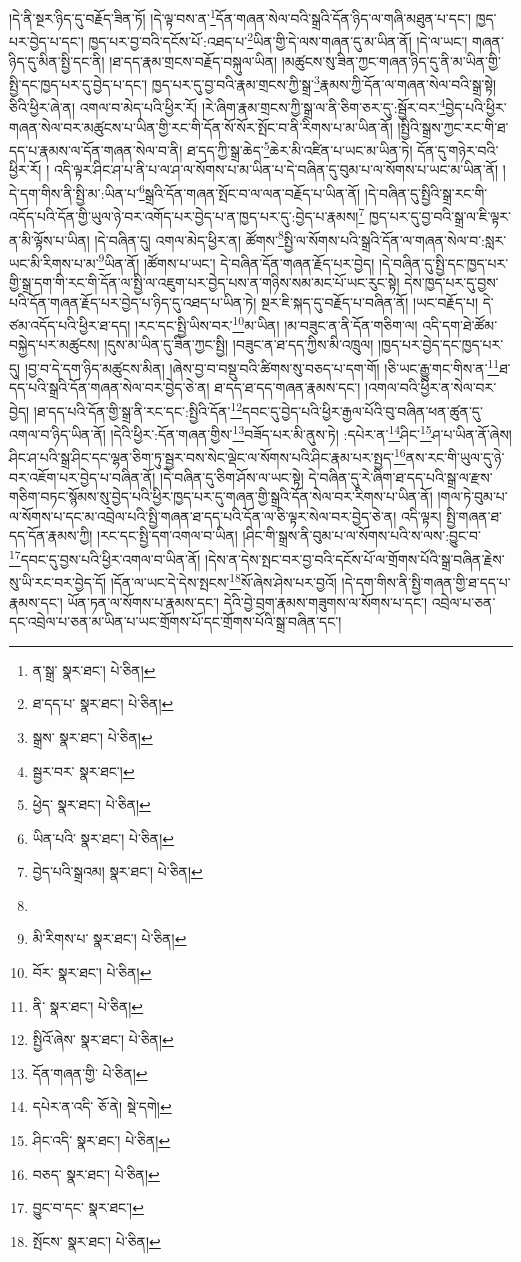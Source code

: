 །དེ་ནི་སྔར་ཉིད་དུ་བརྗོད་ཟིན་ཏོ། །དེ་ལྟ་བས་ན་\footnote{ན་སྒྲ་  སྣར་ཐང་།  པེ་ཅིན། }དོན་གཞན་སེལ་བའི་སྒྲའི་དོན་ཉིད་ལ་གཞི་མཐུན་པ་དང་། ཁྱད་པར་བྱེད་པ་དང་། ཁྱད་པར་བྱ་བའི་དངོས་པོ་:འཐད་པ་\footnote{ཐ་དད་པ་  སྣར་ཐང་།  པེ་ཅིན། }ཡིན་གྱི་དེ་ལས་གཞན་དུ་མ་ཡིན་ནོ། །དེ་ལ་ཡང་། གཞན་ཉིད་དུ་མིན་སྤྱི་དང་ནི། །ཐ་དད་རྣམ་གྲངས་བརྗོད་བསྐུལ་ཡིན། །མཚུངས་སུ་ཟིན་ཀྱང་གཞན་ཉིད་དུ་ནི་མ་ཡིན་གྱི་སྤྱི་དང་ཁྱད་པར་དུ་བྱེད་པ་དང་། ཁྱད་པར་དུ་བྱ་བའི་རྣམ་གྲངས་ཀྱི་སྒྲ་\footnote{སྒྲས་  སྣར་ཐང་།  པེ་ཅིན། }རྣམས་ཀྱི་དོན་ལ་གཞན་སེལ་བའི་སྒྲ་སྟེ། ཅིའི་ཕྱིར་ཞེ་ན། འགལ་བ་མེད་པའི་ཕྱིར་རོ། །རེ་ཞིག་རྣམ་གྲངས་ཀྱི་སྒྲ་ལ་ནི་ཅིག་ཅར་དུ་:སྦྱོར་བར་\footnote{སྦྱར་བར་  སྣར་ཐང་། }བྱེད་པའི་ཕྱིར་གཞན་སེལ་བར་མཚུངས་པ་ཡིན་གྱི་རང་གི་དོན་སོ་སོར་སྤོང་བ་ནི་རིགས་པ་མ་ཡིན་ནོ། །སྤྱིའི་སྒྲས་ཀྱང་རང་གི་ཐ་དད་པ་རྣམས་ལ་དོན་གཞན་སེལ་བ་ནི། ཐ་དད་ཀྱི་སྒྲ་ཆེད་\footnote{ཕྱེད་  སྣར་ཐང་།  པེ་ཅིན། }ཆེར་མི་འཛིན་པ་ཡང་མ་ཡིན་ཏེ། དོན་དུ་གཉེར་བའི་ཕྱིར་རོ། །
འདི་ལྟར་ཤིང་ཤ་པ་ནི་པ་ལ་ཤ་ལ་སོགས་པ་མ་ཡིན་པ་དེ་བཞིན་དུ་བུམ་པ་ལ་སོགས་པ་ཡང་མ་ཡིན་ནོ། །དེ་དག་གིས་ནི་སྤྱི་མ་:ཡིན་པ་\footnote{ཡིན་པའི་  སྣར་ཐང་།  པེ་ཅིན། }སྒྲའི་དོན་གཞན་སྤོང་བ་ལ་ལན་བརྗོད་པ་ཡིན་ནོ། །དེ་བཞིན་དུ་སྤྱིའི་སྒྲ་རང་གི་འདོད་པའི་དོན་གྱི་ཡུལ་ཉེ་བར་འགོད་པར་བྱེད་པ་ན་ཁྱད་པར་དུ་:བྱེད་པ་རྣམས།\footnote{བྱེད་པའི་སྒྲའམ།  སྣར་ཐང་།  པེ་ཅིན། } ཁྱད་པར་དུ་བྱ་བའི་སྒྲ་ལ་ཇི་ལྟར་ན་མི་ལྟོས་པ་ཡིན། །དེ་བཞིན་དུ། འགལ་མེད་ཕྱིར་ན། ཚོགས་\footnote{}སྤྱི་ལ་སོགས་པའི་སྒྲའི་དོན་ལ་གཞན་སེལ་བ་:སླར་ཡང་མི་རིགས་པ་མ་\footnote{མི་རིགས་པ་  སྣར་ཐང་།  པེ་ཅིན། }ཡིན་ནོ། །ཚོགས་པ་ཡང་། དེ་བཞིན་དོན་གཞན་རྗོད་པར་བྱེད། །དེ་བཞིན་དུ་སྤྱི་དང་ཁྱད་པར་གྱི་སྒྲ་དག་གི་རང་གི་དོན་ལ་སྤྱི་ལ་འཇུག་པར་བྱེད་པས་ན་གཉིས་སམ་མང་པོ་ཡང་རུང་སྟེ། དེས་ཁྱད་པར་དུ་བྱས་པའི་དོན་གཞན་རྗོད་པར་བྱེད་པ་ཉིད་དུ་འཐད་པ་ཡིན་ཏེ། སྔར་ཇི་སྐད་དུ་བརྗོད་པ་བཞིན་ནོ། །ཡང་བརྗོད་པ། དེ་ཙམ་འདོད་པའི་ཕྱིར་ཐ་དད། །རང་དང་སྤྱི་ཡིས་བར་\footnote{བོར་  སྣར་ཐང་།  པེ་ཅིན། }མ་ཡིན། །མ་བཟུང་ན་ནི་དོན་གཅིག་ལ། འདི་དག་ཐེ་ཚོམ་བསྐྱེད་པར་མཚུངས། །དུས་མ་ཡིན་དུ་ཟིན་ཀྱང་སྤྱི། །བཟུང་ན་ཐ་དད་ཀྱིས་མི་འཁྲུལ། །ཁྱད་པར་བྱེད་དང་ཁྱད་པར་དུ། །བྱ་བ་དེ་དག་ཉིད་མཚུངས་མིན། །ཞེས་བྱ་བ་བསྡུ་བའི་ཚིགས་སུ་བཅད་པ་དག་གོ། །ཅི་ཡང་རྒྱུ་གང་གིས་ན་\footnote{ནི་  སྣར་ཐང་།  པེ་ཅིན། }ཐ་དད་པའི་སྒྲའི་དོན་གཞན་སེལ་བར་བྱེད་ཅེ་ན། ཐ་དད་ཐ་དད་གཞན་རྣམས་དང་། །འགལ་བའི་ཕྱིར་ན་སེལ་བར་བྱེད། །ཐ་དད་པའི་དོན་གྱི་སྒྲ་ནི་རང་དང་:སྤྱིའི་དོན་\footnote{སྤྱིའོ་ཞེས་  སྣར་ཐང་།  པེ་ཅིན། }དབང་དུ་བྱེད་པའི་ཕྱིར་རྒྱལ་པོའི་བུ་བཞིན་ཕན་ཚུན་དུ་འགལ་བ་ཉིད་ཡིན་ནོ། །དེའི་ཕྱིར་:དོན་གཞན་གྱིས་\footnote{དོན་གཞན་གྱི་  པེ་ཅིན། }བཟོད་པར་མི་ནུས་ཏེ། :དཔེར་ན་\footnote{དཔེར་ན་འདི་  ཅོ་ནེ།  སྡེ་དགེ། }ཤིང་\footnote{ཤིང་འདི་  སྣར་ཐང་།  པེ་ཅིན། }ཤ་པ་ཡིན་ནོ་ཞེས། ཤིང་ཤ་པའི་སྒྲ་ཤིང་དང་ལྷན་ཅིག་ཏུ་སྦྱར་བས་སེང་ལྡེང་ལ་སོགས་པའི་ཤིང་རྣམ་པར་སྤྱད་\footnote{བཅད་  སྣར་ཐང་།  པེ་ཅིན། }ནས་རང་གི་ཡུལ་དུ་ཉེ་བར་འཇོག་པར་བྱེད་པ་བཞིན་ནོ། །དེ་བཞིན་དུ་ཅིག་ཤོས་ལ་ཡང་སྟེ། དེ་བཞིན་དུ་རེ་ཞིག་ཐ་དད་པའི་སྒྲ་ལ་རྫས་གཅིག་བཏང་སྙོམས་སུ་བྱེད་པའི་ཕྱིར་ཁྱད་པར་དུ་གཞན་གྱི་སྒྲའི་དོན་སེལ་བར་རིགས་པ་ཡིན་ནོ། །གལ་ཏེ་བུམ་པ་ལ་སོགས་པ་དང་མ་འབྲེལ་པའི་སྤྱི་གཞན་ཐ་དད་པའི་དོན་ལ་ཅི་ལྟར་སེལ་བར་བྱེད་ཅེ་ན། འདི་ལྟར། སྤྱི་གཞན་ཐ་དད་དོན་རྣམས་ཀྱི། །རང་དང་སྤྱི་དག་འགལ་བ་ཡིན། །ཤིང་གི་སྒྲས་ནི་བུམ་པ་ལ་སོགས་པའི་ས་ལས་:བྱུང་བ་\footnote{བྱུང་བ་དང་  སྣར་ཐང་། }དབང་དུ་བྱས་པའི་ཕྱིར་འགལ་བ་ཡིན་ནོ། །དེས་ན་དེས་སྤང་བར་བྱ་བའི་དངོས་པོ་ལ་གྲོགས་པོའི་སྒྲ་བཞིན་རྗེས་སུ་ཡི་རང་བར་བྱེད་དོ། །དོན་ལ་ཡང་དེ་དེས་སྤངས་\footnote{སྤོངས་  སྣར་ཐང་།  པེ་ཅིན། }སོ་ཞེས་ཤེས་པར་བྱའོ། །དེ་དག་གིས་ནི་སྤྱི་གཞན་གྱི་ཐ་དད་པ་རྣམས་དང་། ཡོན་ཏན་ལ་སོགས་པ་རྣམས་དང་། དེའི་བྱེ་བྲག་རྣམས་གཟུགས་ལ་སོགས་པ་དང་། འབྲེལ་པ་ཅན་དང་འབྲེལ་པ་ཅན་མ་ཡིན་པ་ཡང་གྲོགས་པོ་དང་གྲོགས་པོའི་སྒྲ་བཞིན་དང་། 